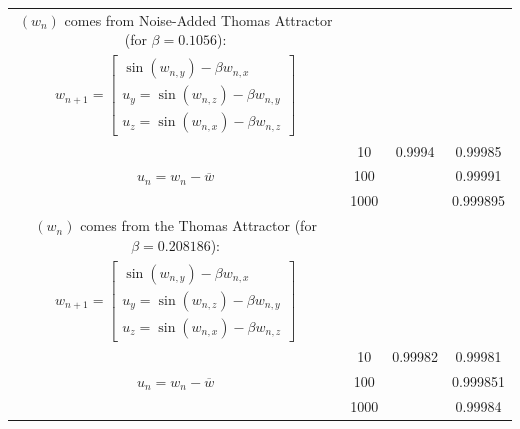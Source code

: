 \documentclass[a4paper,12pt,twoside]{report}
\begin{document}
\begin{center}
\begin{table}
{\begin{tabular}{|c|c| c c |}
          \hline 
          $(w_n)$ comes from Noise-Added Thomas Attractor (for $\beta=0.1056$): & & & \\
          {$w_{n+1}= \begin{bmatrix} \sin(w_{n,y}) - \beta{w_{n,x}} \\
              u_y = \sin(w_{n,z}) - \beta{w_{n,y}} \\
          u_z = \sin(w_{n,x}) - \beta{w_{n,z}} \end{bmatrix}$} & & & \\
          \multirow{3}{*}{$u_n = w_n - \overline{w}$}
              & 10 & 0.9994 & 0.99985 \\
              & 100 & &  0.99991 \\
              & 1000 & & 0.999895\\
          \hline
          
          \hline
          $(w_n)$ comes from the Thomas Attractor (for $\beta=0.208186$): & & & \\
          {$w_{n+1}= \begin{bmatrix} \sin(w_{n,y}) - \beta{w_{n,x}} \\
              u_y = \sin(w_{n,z}) - \beta{w_{n,y}} \\
          u_z = \sin(w_{n,x}) - \beta{w_{n,z}} \end{bmatrix}$} & & & \\
          \multirow{3}{*}{$u_n = w_n - \overline{w}$}
              & 10 & 0.99982 & 0.99981\\
              & 100 & &  0.999851 \\
              & 1000 & & 0.99984 \\
          \hline
  

\end{tabular}}
\end{table}
\end{center}
\end{document}
